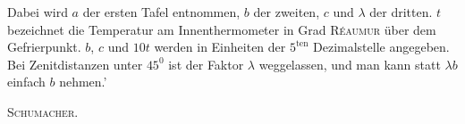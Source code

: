 Dabei wird $a$ der ersten Tafel entnommen, $b$ der zweiten, $c$ und $\lambda$ der dritten. $t$ bezeichnet die Temperatur am Innenthermometer in Grad \textsc{Réaumur} über dem Gefrierpunkt. $b$, $c$ und $10t$ werden in Einheiten der $5^{\mathrm{ten}}$ Dezimalstelle angegeben. Bei Zenitdistanzen unter $45^0$ ist der Faktor $\lambda$ weggelassen, und man kann statt $\lambda b$ einfach $b$ nehmen.'
\begin{flushright}\textsc{Schumacher.}\end{flushright}
\clearpage{}%
\begin{center}
\begingroup\setlength{\fboxsep}{1.2pt}\setlength{\fboxrule}{0.45pt}
\end{center}
